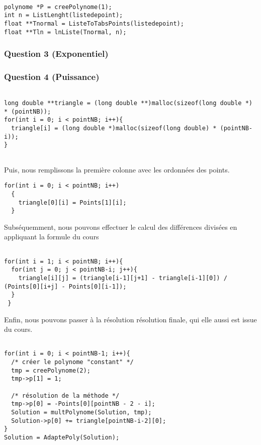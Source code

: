 \documentclass[letter]{article}
\begin{document}
\begin{verbatim}

polynome *P = creePolynome(1);
int n = ListLenght(listedepoint);
float **Tnormal = ListeToTabsPoints(listedepoint);
float **Tln = lnListe(Tnormal, n);

\end{verbatim}



\subsubsection{Question 3 (Exponentiel)}
\label{sec:orgbe1608f}

\subsubsection{Question 4 (Puissance)}
\label{sec:org93ac5d0}



\begin{verbatim}

long double **triangle = (long double **)malloc(sizeof(long double *) * (pointNB));
for(int i = 0; i < pointNB; i++){
  triangle[i] = (long double *)malloc(sizeof(long double) * (pointNB-i));
}


\end{verbatim}

Puis, nous remplissons la première colonne avec les ordonnées des points.

\begin{verbatim}
for(int i = 0; i < pointNB; i++)  
  {
    triangle[0][i] = Points[1][i];
  }

\end{verbatim}

Subséquemment, nous pouvons effectuer le calcul des différences divisées en appliquant la formule du cours

\begin{verbatim}

for(int i = 1; i < pointNB; i++){
  for(int j = 0; j < pointNB-i; j++){
    triangle[i][j] = (triangle[i-1][j+1] - triangle[i-1][0]) / (Points[0][i+j] - Points[0][i-1]);
  }
 }

\end{verbatim}


Enfin, nous pouvons passer à la résolution résolution finale, qui elle aussi est issue du cours.
\begin{verbatim}

for(int i = 0; i < pointNB-1; i++){
  /* créer le polynome "constant" */
  tmp = creePolynome(2);
  tmp->p[1] = 1;

  /* résolution de la méthode */
  tmp->p[0] = -Points[0][pointNB - 2 - i];
  Solution = multPolynome(Solution, tmp);
  Solution->p[0] += triangle[pointNB-i-2][0];
}
Solution = AdaptePoly(Solution);

\end{verbatim}
\end{document}
